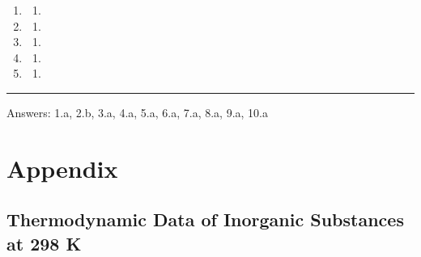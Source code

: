 \documentclass[
  9pt,
]{extbook}
\providecommand{\tightlist}{%
  \setlength{\itemsep}{0pt}\setlength{\parskip}{0pt}}
\theoremstyle{definition}
\theoremstyle{definition}
\theoremstyle{definition}
\theoremstyle{definition}
\theoremstyle{remark}
\begin{document}
\begin{enumerate}
\def\labelenumi{\alph{enumi}.}
\tightlist
\item
  \begin{enumerate}
  \def\labelenumii{\arabic{enumii}.}
  \setcounter{enumii}{2}
  \tightlist
  \item
  \end{enumerate}
\item
  \begin{enumerate}
  \def\labelenumii{\arabic{enumii}.}
  \setcounter{enumii}{1}
  \tightlist
  \item
  \end{enumerate}
\item
  \begin{enumerate}
  \def\labelenumii{\arabic{enumii}.}
  \setcounter{enumii}{3}
  \tightlist
  \item
  \end{enumerate}
\item
  \begin{enumerate}
  \def\labelenumii{\arabic{enumii}.}
  \setcounter{enumii}{4}
  \tightlist
  \item
  \end{enumerate}
\item
  \begin{enumerate}
  \def\labelenumii{\arabic{enumii}.}
  \tightlist
  \item
  \end{enumerate}
\end{enumerate}

\begin{center}\rule{0.5\linewidth}{0.5pt}\end{center}

Answers: 1.a, 2.b, 3.a, 4.a, 5.a, 6.a, 7.a, 8.a, 9.a, 10.a

\renewcommand*{\standardstate}{{-\kern-6pt{\ominus}\kern-6pt-}}

\chapter{Appendix}\label{appendix}

\section{Thermodynamic Data of Inorganic Substances at 298 K}\label{thermodynamic-data-of-inorganic-substances-at-298-k}

\tiny
\end{document}
